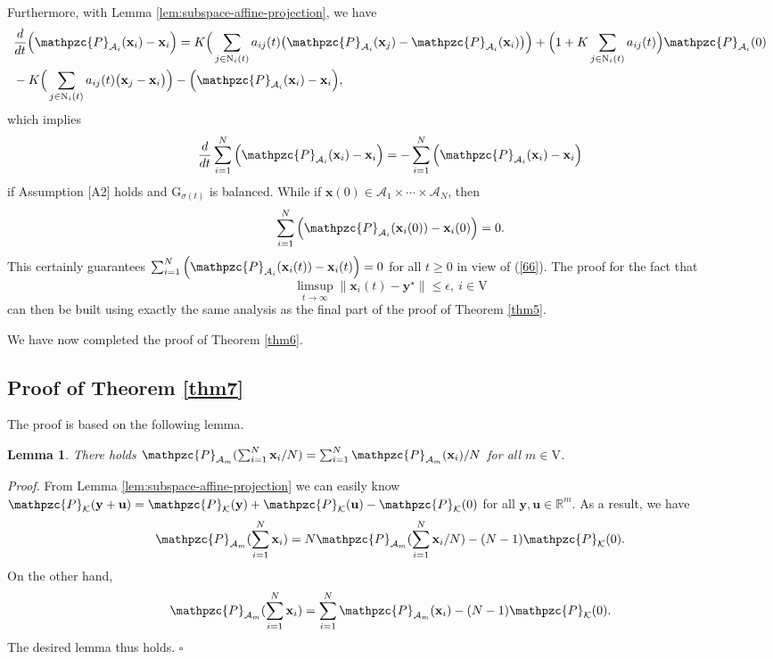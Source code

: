 \documentclass[a4paper, 11pt]{article}
\newtheorem{lemma}{Lemma}
\begin{document}
Furthermore,  with Lemma \ref{lem:subspace-affine-projection}, we have
\begin{align}
&\frac{d}{dt}\Big( \mathpzc{P}_{\mathcal{A}_i}(\mathbf{x}_i)-\mathbf{x}_i\Big)=K\Big( \sum_{j\in \mathrm{N}_i(t)}a_{ij}(t)\big(\mathpzc{P}_{\mathcal{A}_i}(\mathbf{x}_j)-\mathpzc{P}_{\mathcal{A}_i}(\mathbf{x}_i)\big) \Big)+\Big(1+K \sum_{j\in \mathrm{N}_i(t)}a_{ij}(t)\Big) \mathpzc{P}_{\mathcal{A}_i}(0)\nonumber\\
 &- K\Big( \sum_{j\in \mathrm{N}_i(t)}a_{ij}(t)\big(\mathbf{x}_j-\mathbf{x}_i\big) \Big)- \Big(\mathpzc{P}_{\mathcal{A}_i}(\mathbf{x}_i)-\mathbf{x}_i\Big),
\end{align}
which implies
\begin{align}\label{66}
\frac{d}{dt}\sum_{i=1}^N\Big( \mathpzc{P}_{\mathcal{A}_i}(\mathbf{x}_i)-\mathbf{x}_i\Big)=-\sum_{i=1}^N\Big( \mathpzc{P}_{\mathcal{A}_i}(\mathbf{x}_i)-\mathbf{x}_i\Big)
\end{align}
if Assumption [A2] holds and $\mathrm{G}_{\sigma(t)}$ is balanced. While  if $\mathbf{x}(0)\in \mathcal{A}_1\times\cdots \times \mathcal{A}_N$, then $$
\sum_{i=1}^N\Big( \mathpzc{P}_{\mathcal{A}_i}(\mathbf{x}_i(0))-\mathbf{x}_i(0)\Big)=0.
$$
This certainly guarantees $\sum_{i=1}^N\Big( \mathpzc{P}_{\mathcal{A}_i}(\mathbf{x}_i(t))-\mathbf{x}_i(t)\Big)=0$ for all $t\geq 0$ in view of (\ref{66}). The proof for the fact that
 $$
\limsup_{t\to \infty} \big\|\mathbf{x}_i(t)-\mathbf{y}^\star\big\|\leq \epsilon, \ i\in\mathrm{V}
$$
 can then be built using exactly the same analysis as the final part of the proof of Theorem \ref{thm5}.

We have now completed the proof of Theorem \ref{thm6}.






\subsection{Proof of Theorem \ref{thm7}}
The proof is based on the following lemma.

\begin{lemma}
There holds $\mathpzc{P}_{\mathcal{A}_m}({\sum_{i=1}^N \mathbf{x}_i}/{N})=\sum_{i=1}^N\mathpzc{P}_{\mathcal{A}_m}({\mathbf{x}_i})/N$ for all $m\in\mathrm{V}$.
\end{lemma}
{\it Proof.} From Lemma \ref{lem:subspace-affine-projection} we can easily know $\mathpzc{P}_{\mathcal{K}} (\mathbf{y} +\mathbf{u})=\mathpzc{P}_{\mathcal{K}}(\mathbf{y})+\mathpzc{P}_{\mathcal{K}}(\mathbf{u})-\mathpzc{P}_{\mathcal{K}}(0)$ for all $\mathbf{y},\mathbf{u}\in\mathbb{R}^m$. As a result, we have
\begin{align}
\mathpzc{P}_{\mathcal{A}_m}({\sum_{i=1}^N \mathbf{x}_i})=N\mathpzc{P}_{\mathcal{A}_m}({\sum_{i=1}^N \mathbf{x}_i}/{N})- (N-1)\mathpzc{P}_{\mathcal{K}}(0).
\end{align}
On the other hand,
\begin{align}
\mathpzc{P}_{\mathcal{A}_m}({\sum_{i=1}^N \mathbf{x}_i})=\sum_{i=1}^N \mathpzc{P}_{\mathcal{A}_m}({\mathbf{x}_i})- (N-1)\mathpzc{P}_{\mathcal{K}}(0).
\end{align}
The desired lemma thus holds. \hfill$\square$
\end{document}
